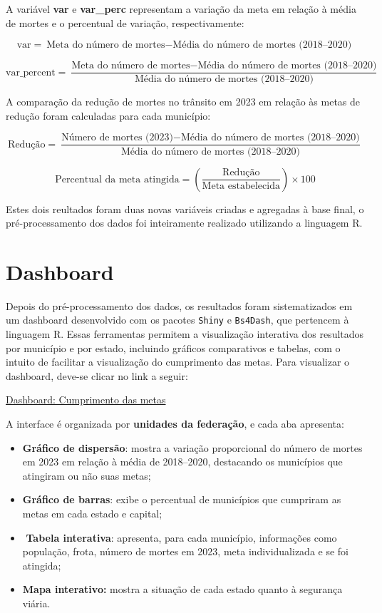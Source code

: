 \documentclass[
  letterpaper,
  DIV=11,
  numbers=noendperiod]{scrreprt}
\begin{document}
A variável \textbf{var} e \textbf{var\_perc} representam a variação da
meta em relação à média de mortes e o percentual de variação,
respectivamente:

\[
\text{var} = {\text{Meta do número de mortes} - \text{Média do número de mortes (2018–2020)}}
\]

\[
\text{var_percent} = \frac{\text{Meta do número de mortes} - \text{Média do número de mortes (2018–2020)}}{\text{Média do número de mortes (2018–2020)}}
\]

A comparação da redução de mortes no trânsito em 2023 em relação às
metas de redução foram calculadas para cada município:

\[
\text{Redução} = \frac{\text{Número de mortes (2023)} - \text{Média do número de mortes (2018–2020)}}{\text{Média do número de mortes (2018–2020)}}
\]

\[
\text{Percentual da meta atingida} = \left( \frac{\text{Redução}}{\text{Meta estabelecida}} \right) \times 100
\]

Estes dois reultados foram duas novas variáveis criadas e agregadas à
base final, o pré-processamento dos dados foi inteiramente realizado
utilizando a linguagem R.

\section{Dashboard}\label{dashboard}

Depois do pré-processamento dos dados, os resultados foram
sistematizados em um dashboard desenvolvido com os pacotes
\texttt{Shiny} e \texttt{Bs4Dash}, que pertencem à linguagem R. Essas
ferramentas permitem a visualização interativa dos resultados por
município e por estado, incluindo gráficos comparativos e tabelas, com o
intuito de facilitar a visualização do cumprimento das metas. Para
visualizar o dashboard, deve-se clicar no link a seguir:

\href{https://beatrizmarques.shinyapps.io/cumprimento_metas/}{Dashboard:
Cumprimento das metas}

A interface é organizada por \textbf{unidades da federação}, e cada aba
apresenta:

\begin{itemize}
\item
  \textbf{Gráfico de dispersão}: mostra a variação proporcional do
  número de mortes em 2023 em relação à média de 2018--2020, destacando
  os municípios que atingiram ou não suas metas;
\item
  \textbf{Gráfico de barras}: exibe o percentual de municípios que
  cumpriram as metas em cada estado e capital;
\item
  ️ \textbf{Tabela interativa}: apresenta, para cada município,
  informações como população, frota, número de mortes em 2023, meta
  individualizada e se foi atingida;
\item
  \textbf{Mapa interativo:} mostra a situação de cada estado quanto à
  segurança viária.
\end{itemize}
\end{document}
